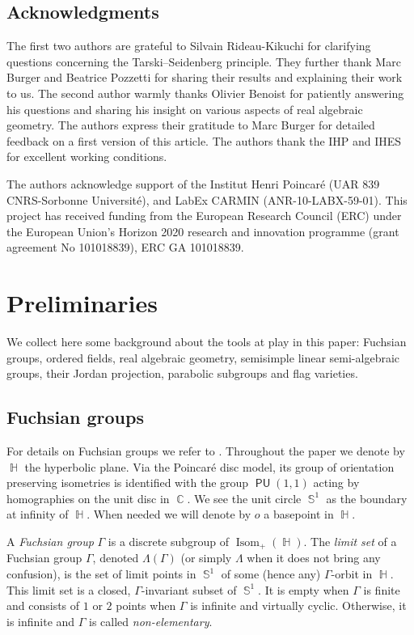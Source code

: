 \documentclass{amsart}
\theoremstyle{plain}
\theoremstyle{definition}
\DeclareMathOperator{\PU}{\mathsf{PU}}
\DeclareMathOperator{\Isom}{Isom}
\DeclareMathOperator{\Cb}{\mathbb{C}}
\DeclareMathOperator{\Hb}{\mathbb{H}}
\DeclareMathOperator{\Sb}{\mathbb{S}}
\newcommand{\1}{\mathbf{1}}
\begin{document}
\subsection*{Acknowledgments}
The first two authors are grateful to Silvain Rideau-Kikuchi for clarifying questions concerning the Tarski--Seidenberg principle.
They further thank Marc Burger and Beatrice Pozzetti for sharing their results and explaining their work to us.
The second author warmly thanks Olivier Benoist for patiently answering his questions and sharing his insight on various aspects of real algebraic geometry.
The authors express their gratitude to Marc Burger for detailed feedback on a first version of this article.
The authors thank the IHP and IHES for excellent working conditions.

The authors acknowledge support of the Institut Henri Poincaré (UAR 839 CNRS-Sorbonne Université), and LabEx CARMIN (ANR-10-LABX-59-01).
This project has received funding from the European Research Council (ERC) under the European Union’s Horizon 2020 research and innovation programme (grant agreement No 101018839), ERC GA 101018839.



\section{Preliminaries} \label{s: Preliminaries}

We collect here some background about the tools at play in this paper: Fuchsian groups, ordered fields, real algebraic geometry, semisimple linear semi-algebraic groups, their Jordan projection, parabolic subgroups and flag varieties.

\subsection{Fuchsian groups}\label{s: Fuchsian groups}

For details on Fuchsian groups we refer to \cite{Katok}.\break
Throughout the paper we denote by $\Hb$ the hyperbolic plane.
Via the Poincaré disc model, its group of orientation preserving isometries is identified with the group $\PU(1,1)$ acting by homographies on the unit disc in $\Cb$. We see the unit circle $\Sb^1$ as the boundary at infinity of $\Hb$. When needed we will denote by $o$ a basepoint in $\Hb$.

A \emph{Fuchsian group} $\Gamma$ is a discrete subgroup of $\Isom_+(\Hb)$. The \emph{limit set} of a Fuchsian group $\Gamma$, denoted $\Lambda(\Gamma)$ (or simply $\Lambda$ when it does not bring any confusion), is the set of limit points in $\Sb^1$ of some (hence any) $\Gamma$-orbit in $\Hb$. This limit set is a closed, $\Gamma$-invariant subset of $\Sb^1$. It is empty when $\Gamma$ is finite and consists of $1$ or $2$ points when $\Gamma$ is infinite and virtually cyclic. Otherwise, it is infinite and $\Gamma$ is called \emph{non-elementary}.
\end{document}
